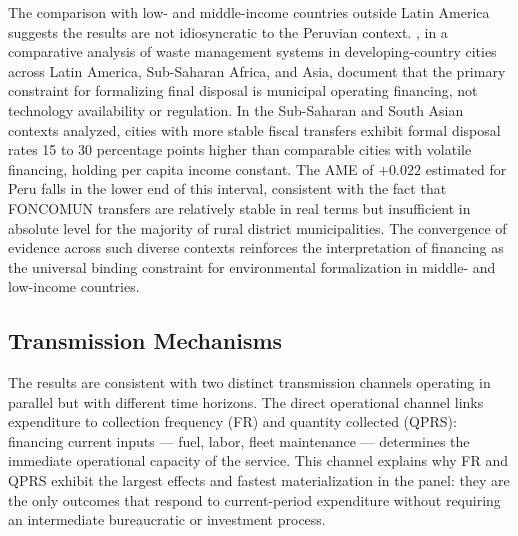 The comparison with low- and middle-income countries outside Latin America suggests the results are not idiosyncratic to the Peruvian context.
\citet{Guerrero2013}, in a comparative analysis of waste management systems in developing-country cities across Latin America, Sub-Saharan Africa, and Asia, document that the primary constraint for formalizing final disposal is municipal operating financing, not technology availability or regulation.
In the Sub-Saharan and South Asian contexts analyzed, cities with more stable fiscal transfers exhibit formal disposal rates 15 to 30 percentage points higher than comparable cities with volatile financing, holding per capita income constant.
The AME of $+0.022$ estimated for Peru falls in the lower end of this interval, consistent with the fact that FONCOMUN transfers are relatively stable in real terms but insufficient in absolute level for the majority of rural district municipalities.
The convergence of evidence across such diverse contexts reinforces the interpretation of financing as the universal binding constraint for environmental formalization in middle- and low-income countries.

\subsection{Transmission Mechanisms}
\label{sec:mecanismos}

The results are consistent with two distinct transmission channels operating in parallel but with different time horizons. The direct operational channel links expenditure to collection frequency (FR) and quantity collected (QPRS): financing current inputs --- fuel, labor, fleet maintenance --- determines the immediate operational capacity of the service. This channel explains why FR and QPRS exhibit the largest effects and fastest materialization in the panel: they are the only outcomes that respond to current-period expenditure without requiring an intermediate bureaucratic or investment process.

